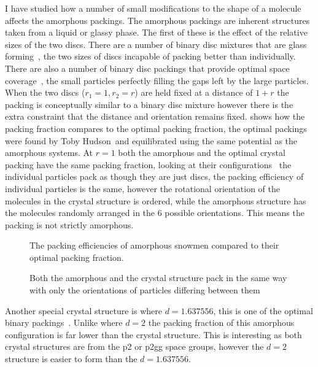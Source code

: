 I have studied how a number of small modifications to the shape of a molecule affects the amorphous packings. The amorphous packings are inherent structures taken from a liquid or glassy phase. The first of these is the effect of the relative sizes of the two discs. There are a number of binary disc mixtures that are glass forming~\tocite, the two sizes of discs incapable of packing better than individually. There are also a number of binary disc packings that provide optimal space coverage~\tocite, the small particles perfectly filling the gaps left by the large particles. When the two discs ($r_1 = 1, r_2 = r$) are held fixed at a distance of $1+r$ the packing is conceptually similar to a binary disc mixture however there is the extra constraint that the distance and orientation remains fixed.  shows how the packing fraction compares to the optimal packing fraction, the optimal packings were found by Toby Hudson~\tocite and equilibrated using the same potential as the amorphous systems\toref. At $r = 1$ both the amorphous and the optimal crystal packing have the same packing fraction, looking at their configurations~ the individual particles pack as though they are just discs, the packing efficiency of individual particles is the same, however the rotational orientation of the molecules in the crystal structure is ordered, while the amorphous structure has the molecules randomly arranged in the 6 possible orientations\tocheck. This means the packing is not strictly amorphous.

\begin{figure}
    \caption{The packing efficiencies of amorphous snowmen compared to their optimal packing fraction.}
    \label{fig:fix d var r}
\end{figure}

\begin{figure}
    \label{fig:config:d1r2}
    \caption{Both the amorphous and the crystal structure pack in the same way with only the orientations of particles differing between them}
\end{figure}

Another special crystal structure is where $d=1.637556$, this is one of the optimal binary packings~. Unlike where $d=2$ the packing fraction of this amorphous configuration is far lower than the crystal structure. This is interesting as both crystal structures are from the p2 or p2gg space groups, however the $d=2$ structure is easier to form than the $d=1.637556$.

